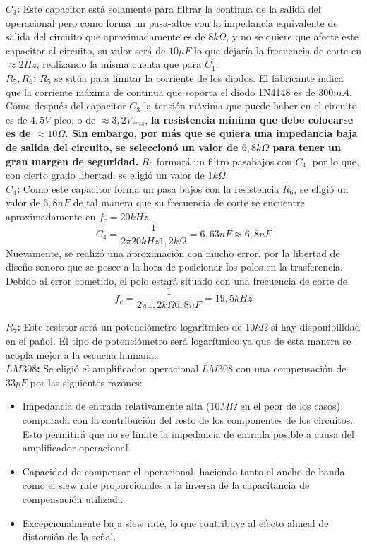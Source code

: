 \textbf{$C_3$:} Este capacitor está solamente para filtrar la continua de la salida del operacional pero como forma un pasa-altos con la impedancia equivalente de salida del circuito que aproximadamente es de $8k\Omega$, y no se quiere que afecte este capacitor al circuito, su valor será de $10\mu F$ lo que dejaría la frecuencia de corte en $\approx 2Hz$, realizando la misma cuenta que para $C_1$.\\

\textbf{$R_5, R_6$:} $R_5$ se sitúa para limitar la corriente de los diodos. El fabricante indica que la corriente máxima de continua que soporta el diodo 1N4148 es de $300mA$. Como después del capacitor $C_3$ la tensión máxima que puede haber en el circuito es de $4,5V$ pico, o de $\approx 3,2V_{rms}$, \textbf{la resistencia mínima que debe colocarse es de $\approx 10\Omega$. Sin embargo, por más que se quiera una impedancia baja de salida del circuito, se seleccionó un valor de $6,8k\Omega$ para tener un gran margen de seguridad.} $R_6$ formará un filtro pasabajos con $C_4$, por lo que, con cierto grado libertad, se eligió un valor de $1k\Omega$.\\

\textbf{$C_4$:} Como este capacitor forma un pasa bajos con la resistencia $R_6$, se eligió un valor de $6,8nF$ de tal manera que su frecuencia de corte se encuentre aproximadamente en $f_c = 20kHz$.
\[ C_4 = \frac{1}{2\pi 20kHz 1,2k\Omega} = 6,63nF \approx 6,8nF\]
Nuevamente, se realizó una aproximación con mucho error, por la libertad de diseño sonoro que se posee a la hora de posicionar los polos en la trasferencia. Debido al error cometido, el polo estará situado con una frecuencia de corte de $$ f_c = \frac{1}{2\pi 1,2k\Omega 6,8nF} = 19,5kHz $$

\textbf{$R_7$:} Este resistor será un potenciómetro logarítmico de $10k\Omega$ si hay disponibilidad en el pañol. El tipo de potenciómetro será logarítmico ya que de esta manera se acopla mejor a la escucha humana.\\

\textbf{$LM308$:} Se eligió el amplificador operacional $LM308$ con una compensación de $33pF$ por las siguientes razones:

\begin{itemize}
\item Impedancia de entrada relativamente alta ($10M\Omega$ en el peor de los casos) comparada con la contribución del resto de los componentes de los circuitos. Esto permitirá que no se limite la impedancia de entrada posible a causa del amplificador operacional.
\item Capacidad de compensar el operacional, haciendo tanto el ancho de banda como el slew rate proporcionales a la inversa de la capacitancia de compensación utilizada.
\item Excepcionalmente baja slew rate, lo que contribuye al efecto alineal de distorsión de la señal.
\end{itemize}

